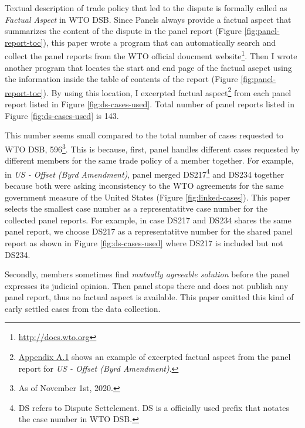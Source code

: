 Textual description of trade policy that 
led to the dispute is formally called as
\textit{Factual Aspect} in WTO DSB. 
Since Panels
always provide a factual aspect
that summarizes the content of the dispute
in the panel report (Figure \ref{fig:panel-report-toc}),
this paper wrote a program that can 
automatically search and collect 
the panel reports from the WTO official doucment website\footnote{
    \url{http://docs.wto.org}
}.
Then I wrote another program that locates the start 
and end page of the factual asepct using the information inside the 
table of contents of the report (Figure \ref{fig:panel-report-toc}).
By using this location, I excerpted factual aspect\footnote{
    \hyperref[sub:factual-aspect-example]{Appendix A.1} shows an
    example of excerpted factual aspect from the panel report for \textit{US - Offset (Byrd Amendment)}.    
}
from each panel report listed in Figure \ref{fig:ds-cases-used}. 
Total number of panel reports listed in Figure \ref{fig:ds-cases-used} is 143.


This number seems small compared to the total number of cases requested to WTO DSB, 596\footnote
{
    As of November 1st, 2020.
}. This is because, first, panel handles different cases requested by different members
for the same trade policy of a member together. For example, in \textit{US - Offset (Byrd Amendment)}, panel merged DS217\footnote{
    DS refers to Dispute Settelement. DS is a officially used prefix that notates the case number in WTO DSB.
} and DS234 together because both were asking inconsistency to the WTO agreements for the same government measure of the United States (Figure \ref{fig:linked-cases}). This paper selects the smallest case number as a representatitve case number for the collected panel reports. For example, in case DS217 and DS234 shares the same panel report, we choose DS217 as a representatitve number for the shared panel report as shown in Figure \ref{fig:ds-cases-used} where DS217 is included but not DS234.

Secondly, members sometimes find \textit{mutually agreeable solution} before the panel expresses its judicial opinion. Then panel stops there and does not publish any panel report, thus no factual aspect is available. This paper omitted this kind of early settled cases from the data collection.

 


